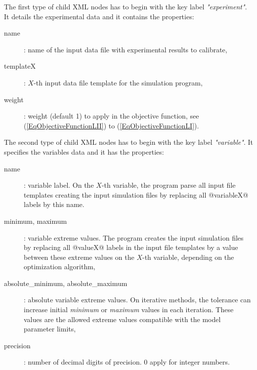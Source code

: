 \documentclass[a4paper]{report}
\begin{document}
The first type of child XML nodes has to begin with the key label
\emph{"experiment"}. It details the experimental data and it contains the properties:
\begin{description}
	\item[name]: name of the input data file with experimental results to calibrate,
	\item[templateX]: $X$-th input data file template for the simulation program,
	\item[weight]: weight (default 1) to apply in the objective function, see (\ref{EqObjectiveFunctionLII}) to (\ref{EqObjectiveFunctionLI}).
\end{description}

The second type of child XML nodes has to begin with the key label
\emph{"variable"}. It specifies the variables data and it has the properties:
\begin{description}
	\item[name]: variable label. On the $X$-th variable, the program parse all input
file templates creating the input simulation files by replacing all
@variableX@ labels by this name.
\item[minimum, maximum]: variable extreme values. The program creates the input
simulation files by replacing all @valueX@ labels in the input file templates
by a value between these extreme values on the $X$-th variable, depending on the
optimization algorithm,
\item[absolute\_minimum, absolute\_maximum]: absolute variable extreme values.
On iterative methods, the tolerance can increase initial \emph{minimum} or
\emph{maximum} values in each iteration. These values are the allowed extreme values
compatible with the model parameter limits,
\item[precision]: number of decimal digits of precision. 0 apply for integer numbers.
\end{description}
\end{document}
